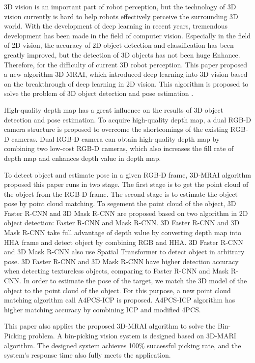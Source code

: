 \begin{eabstract}
3D vision is an important part of robot perception, but the technology of 3D vision currently is hard to help robots effectively perceive the surrounding 3D world. With the development of deep learning in recent years, tremendous development has been made in the field of computer vision. Especially in the field of 2D vision, the accuracy of 2D object detection and classification has been greatly improved, but the detection of 3D objects has not been huge Enhance. Therefore, for the difficulty of current 3D robot perception. This paper proposed a new algorithm 3D-MRAI, which introduced deep learning into 3D vision based on the breakthrough of deep learning in 2D vision. This algorithm is proposed to solve the problem of 3D object detection and pose estimation .

High-quality depth map has a great influence on the results of 3D object detection and pose estimation. To acquire high-quality depth map, a dual RGB-D camera structure is proposed to overcome the shortcomings of the existing RGB-D cameras. Dual RGB-D camera can obtain high-quality depth map by combining two low-cost RGB-D cameras, which also increases the fill rate of depth map and enhances depth value in depth map.

To detect object and estimate pose in a given RGB-D frame, 3D-MRAI algorithm proposed this paper runs in two stage. The first stage is to get the point cloud of the object from the RGB-D frame. The second stage is to estimate the object pose by point cloud matching. To segement the point cloud of the object, 3D Faster R-CNN and 3D Mask R-CNN are proposed based on two algorithm in 2D object detection: Faster R-CNN and Mask R-CNN. 3D Faster R-CNN and 3D Mask R-CNN take full advantage of depth value by converting depth map into HHA frame and detect object by combining RGB and HHA. 3D Faster R-CNN and 3D Mask R-CNN also use Spatial Transformer to detect object in arbitrary pose.  3D Faster R-CNN and 3D Mask R-CNN have higher detection accuracy when detecting textureless objects, comparing to Faster R-CNN and Mask R-CNN. In order to estimate the pose of the target, we match the 3D model of the object to the point cloud of the object. For this purpose, a new point cloud matching algorithm call A4PCS-ICP is proposed. A4PCS-ICP algorithm has higher matching accuracy by combining ICP and modified 4PCS.

  This paper also applies the proposed 3D-MRAI algorithm to solve the Bin-Picking problem. A bin-picking vision system is designed based on 3D-MARI algorithm. The designed system achieves 100\% successful picking rate, and the system's response time also fully meets the application.

\end{eabstract}


